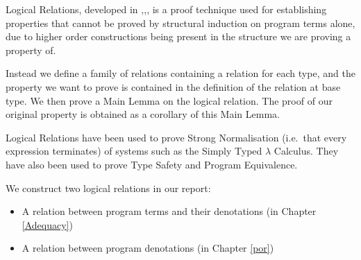 Logical Relations, developed in \citep{Tait67},\citep{Plotkin73},\citep{Statman85}, is a proof technique used for establishing properties that cannot be proved by structural induction on program terms alone, due to higher order constructions being present in the structure we are proving a property of.

Instead we define a family of relations containing a relation for each type, and the property we want to prove is contained in the definition of the relation at base type. We then prove a Main Lemma on the logical  relation. The proof of our original property is  obtained as a corollary of this Main Lemma.

Logical Relations have been used to prove Strong Normalisation (i.e.\ that every expression terminates) of systems such as the Simply Typed $\lambda$ Calculus. They have also been used to prove Type Safety and Program Equivalence.

We construct two logical relations in our report:

\begin{itemize}
\item{A relation between program terms and their denotations (in Chapter \ref{Adequacy})}
\item{A relation between program denotations (in Chapter \ref{por})}
\end{itemize}


%
%
%
%
